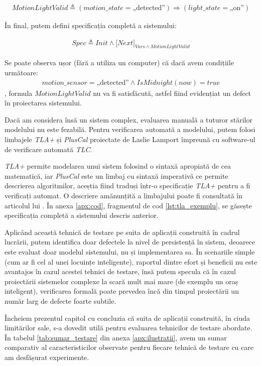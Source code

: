 \begin{align*}
    MotionLightValid \triangleq (motion\_state = \text{„detected”}) \Rightarrow (light\_state = \text{„on”})
\end{align*}

În final, putem defini specificația completă a sistemului:

\begin{align*}
    Spec \triangleq Init \wedge {[}Next{]}_{Vars \wedge MotionLightValid}
\end{align*}

Se poate observa ușor (fără a utiliza un computer) că dacă avem condițiile următoare:
\begin{gather*}
    motion\_sensor = \text{„detected”} \wedge IsMidnight(now) = true
\end{gather*}
, formula $MotionLightValid$ nu va fi satisfăcută, astfel fiind evidențiat un defect în proiectarea sistemului.

Dacă am considera însă un sistem complex, evaluarea manuală a tuturor stărilor modelului nu este fezabilă. Pentru verificarea automată a modelului, putem folosi limbajele \textit{TLA+} și \textit{PlusCal} proiectate de Laslie Lamport împreună cu software-ul de verificare automată \textit{TLC}. 

\textit{TLA+} permite modelarea unui sistem folosind o sintaxă apropiată de cea matematică, iar \textit{PlusCal} este un limbaj cu sintaxă imperativă ce permite descrierea algoritmilor, aceștia fiind traduși într-o specificație \textit{TLA+} pentru a fi verificați automat. O descriere amănunțită a limbajului poate fi consultată în articolul lui . În anexa \ref{apx:cod}, fragmentul de cod \ref{lst:tla_exemplu}, se găsește specificația completă a sistemului descris anterior.

Aplicând această tehnică de testare pe suita de aplicații construită în cadrul lucrării, putem identifica doar defectele la nivel de persistență în sistem, deoarece este evaluat doar modelul sistemului, nu și implementarea sa. În scenariile simple (cum ar fi cel al unei locuințe inteligente), raportul dintre efort și beneficii nu este avantajos în cazul acestei tehnici de testare, însă putem specula că în cazul proiectării sistemelor complexe la scară mult mai mare (de exemplu un oraș inteligent), verificarea formală poate prevedea încă din timpul proiectării un număr larg de defecte foarte subtile.

Încheiem prezentul capitol cu concluzia că suita de aplicații construită, în ciuda limitărilor sale, s-a dovedit utilă pentru evaluarea tehnicilor de testare abordate. În tabelul \ref{tab:sumar_testare} din anexa \ref{apx:ilustratii}, avem un sumar comparativ al caracteristicilor observate pentru fiecare tehnică de testare cu care am desfășurat experimente. 